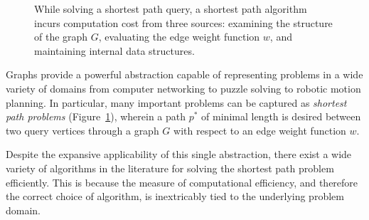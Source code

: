 \documentclass[nobib]{tufte-book}
\begin{document}
\begin{figure}
\centering
{}
\caption{While solving a shortest path query,
   a shortest path algorithm incurs computation cost from three sources:
   examining the structure of the graph $G$,
   evaluating the edge weight function $w$,
   and maintaining internal data structures.}
\label{fig:sp-intro}
\end{figure}

Graphs provide a powerful abstraction
capable of representing problems in a wide variety of domains
from computer networking to puzzle solving
to robotic motion planning.
In particular,
many important problems can be captured
as \emph{shortest path problems} (Figure~\ref{fig:sp-intro}),
wherein a path $p^*$ of minimal length is desired
between two query vertices through a graph $G$
with respect to an edge weight function $w$.

Despite the expansive applicability of this single abstraction,
there exist a wide variety of algorithms in the literature
for solving the shortest path problem efficiently.
This is because the measure of computational efficiency,
and therefore the correct choice of algorithm,
is inextricably tied to the underlying problem domain.
\end{document}
